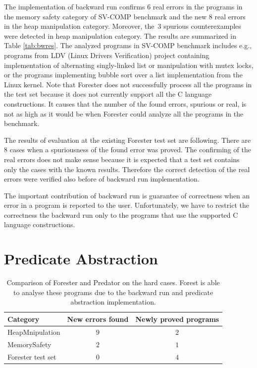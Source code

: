 The implementation of backward run confirms $6$ real errors in the programs
in the memory safety category of SV-COMP benchmark and
the new $8$ real errors in the heap manipulation category.
Moreover, the~$3$ spurious counterexamples were detected in heap manipulation category.
The results are summarized in Table \ref{tab:bwres}.
The analyzed programs in SV-COMP benchmark includes 
e.g., programs from LDV (Linux Drivers Verification) project
containing implementation of alternating singly-linked list
or manipulation with mutex locks, or the programs
implementing bubble sort over a list implementation from the Linux kernel.
Note that Forester does not successfully process all the programs in the test set
because it does not currently support all the C language constructions.
It causes that the number of the found errors, spurious or real, is not as high as it would be when
Forester could analyze all the programs in the benchmark.

The results of evaluation at the existing Forester test set are following.
There are $8$ cases when a spuriousness of the found error was proved.
The confirming of the real errors does not make sense because
it is expected that a test set contains only the cases with the known results.
Therefore the correct detection of the real errors were verified
also before of backward run implementation.

The important contribution of backward run is guarantee of correctness when
an error in a program is reported to the user.
Unfortunately, we have to restrict the correctness the backward run
only to the programs that use the supported C language constructions.

\section{Predicate Abstraction}
\label{sec:paeval}

\begin{table}[bt]
	\vskip6pt
	\caption{Comparison of Forester and Predator on the hard cases.
		Forest is able to analyse these programs due to the backward
		run and predicate abstraction implementation.
	}
	\centering
	\begin{tabular}{lcc}
		\toprule
		Category & New errors found & Newly proved programs  \\
		\midrule
		HeapMnipulation & $9$ & $2$ \\
		MemorySafety & $2$ & $1$ \\
		Forester test set & $0$ & $4$  \\
		\bottomrule
	\end{tabular}
	\label{tab:pares}
\end{table}

